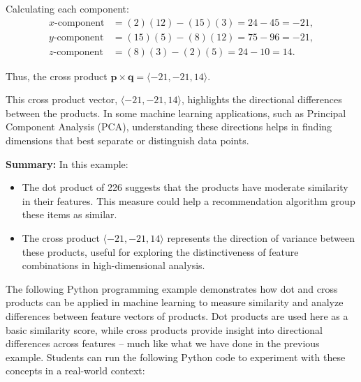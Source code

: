 \begin{example}
\begin{solution}
\begin{enumerate}
    \noindent Calculating each component:
    \begin{align*}
        x\text{-component} &= (2)(12) - (15)(3) = 24 - 45 = -21, \\
        y\text{-component} &= (15)(5) - (8)(12) = 75 - 96 = -21, \\
        z\text{-component} &= (8)(3) - (2)(5) = 24 - 10 = 14.
    \end{align*}

    \noindent Thus, the cross product \( \mathbf{p} \times \mathbf{q} = \langle -21, -21, 14 \rangle \).
    
    \noindent This cross product vector, \( \langle -21, -21, 14 \rangle \), highlights the directional differences between the products. In some machine learning applications, such as Principal Component Analysis (PCA), understanding these directions helps in finding dimensions that best separate or distinguish data points.

\end{enumerate}

\noindent \textbf{Summary:} In this example:
\begin{itemize}
    \item The dot product of 226 suggests that the products have moderate similarity in their features. This measure could help a recommendation algorithm group these items as similar.
    \item The cross product \( \langle -21, -21, 14 \rangle \) represents the direction of variance between these products, useful for exploring the distinctiveness of feature combinations in high-dimensional analysis.
\end{itemize}
\end{solution}
\end{example}
\exampleline



\vspace{1.3em}

\noindent The following Python programming example demonstrates how dot and cross products can be applied in machine learning to measure similarity and analyze differences between feature vectors of products. Dot products are used here as a basic similarity score, while cross products provide insight into directional differences across features -- much like what we have done in the previous example. Students can run the following Python code to experiment with these concepts in a real-world context:

\vspace{1.3em}

